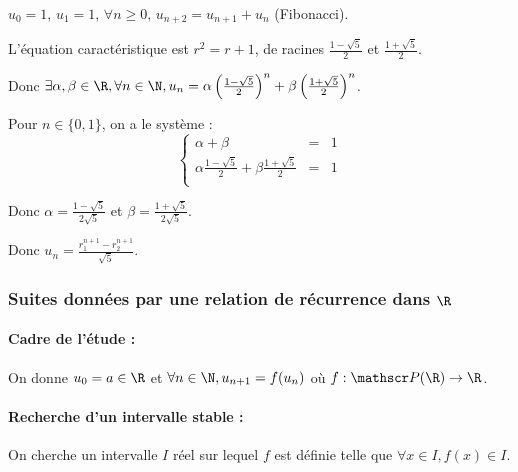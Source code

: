 \begin{exemple}
    $u_0 = 1$, $u_1 = 1$, $\forall n \geqslant 0, \, u_{n + 2} = u_{n + 1} + u_n$ (Fibonacci).

    L'équation caractéristique est $r^2 = r + 1$, de racines $\frac{1 - \sqrt{5}} 2$ et $\frac{1 + \sqrt{5}} 2$.

    \svspace Donc $\exists \alpha, \beta \in \R, \forall n \in \N, u_n = \alpha \left(\frac{1 - \sqrt{5}} 2\right)^n + \beta \left(\frac{1 + \sqrt{5}} 2\right)^n$.

    Pour $n \in \{0, 1\}$, on a le système :
    \[\left\{
        \begin{array}{rcl}
            \alpha + \beta & = & 1 \\
            \alpha \frac{1 - \sqrt{5}} 2 + \beta \frac{1 + \sqrt{5}} 2 & = & 1 \\
        \end{array}
    \right.\]

    Donc $\alpha = \frac{1 - \sqrt{5}}{2\sqrt{5}}$ et $\beta = \frac{1 + \sqrt{5}}{2\sqrt{5}}$.
    
    Donc $\displaystyle u_n = \frac{r_1^{n + 1} - r_2^{n + 1}}{\sqrt 5}$.
\end{exemple}

\subsubsection{Suites données par une relation de récurrence dans $\R$}
\paragraph{Cadre de l'étude :}
On donne $u_0 = a \in \R$ et $\forall n \in \N, u_{n + 1} = f(u_n)$ où $f: \mathscr P(\R) \to \R$.

\paragraph{Recherche d'un intervalle stable :}
On cherche un intervalle $I$ réel sur lequel $f$ est définie
telle que $\forall x \in I, f(x) \in I$.

